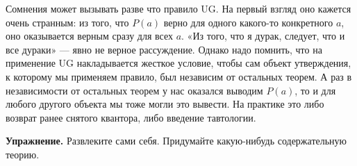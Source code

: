 Сомнения может вызывать разве что правило UG. На первый взгляд оно кажется очень странным: из того, что $P(a)$ верно для одного какого-то конкретного $a$, оно оказывается верным сразу для всех $a$. «Из того, что я дурак, следует, что и все дураки» — явно не верное рассуждение. Однако надо помнить, что на применение UG накладывается жесткое условие, чтобы сам объект утверждения, к которому мы применяем правило, был независим от остальных теорем. А раз в независимости от остальных теорем у нас оказался выводим $P(a)$, то и для любого другого объекта мы тоже могли это вывести. На практике это либо возврат ранее снятого квантора, либо введение тавтологии.

{\bfseries Упражнение.} Развлеките сами себя. Придумайте какую-нибудь содержательную теорию.
